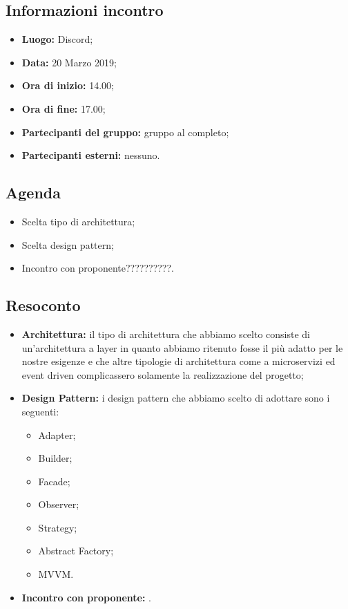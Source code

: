 \subsection{Informazioni incontro}
\begin{itemize}
	\item { \textbf{Luogo:} Discord};
	\item { \textbf{Data:} 20 Marzo 2019};
	\item { \textbf{Ora di inizio:} 14.00};
	\item { \textbf{Ora di fine:} 17.00};
	\item { \textbf{Partecipanti del gruppo:} gruppo al completo};
	\item { \textbf{Partecipanti esterni:} nessuno}.
\end{itemize}


\subsection{Agenda}
\begin{itemize}
	\item {Scelta tipo di architettura;}
	\item {Scelta design pattern;}
	\item {Incontro con proponente??????????.}
\end{itemize}

\subsection{Resoconto}
\begin{itemize}
	\item { \textbf{Architettura:} il tipo di architettura che abbiamo scelto consiste di un'architettura a layer in quanto abbiamo ritenuto fosse il più adatto per le nostre esigenze e che altre tipologie di architettura come a microservizi ed event driven complicassero solamente la realizzazione del progetto;}
	\item { \textbf{Design Pattern:} i design pattern che abbiamo scelto di adottare sono i seguenti:
	\begin{itemize}
		\item Adapter;
		\item Builder;
		\item Facade;
		\item Observer;
		\item Strategy;
		\item Abstract Factory;
		\item MVVM.
	\end{itemize}}	
	\item { \textbf{Incontro con proponente:} .}
\end{itemize}

